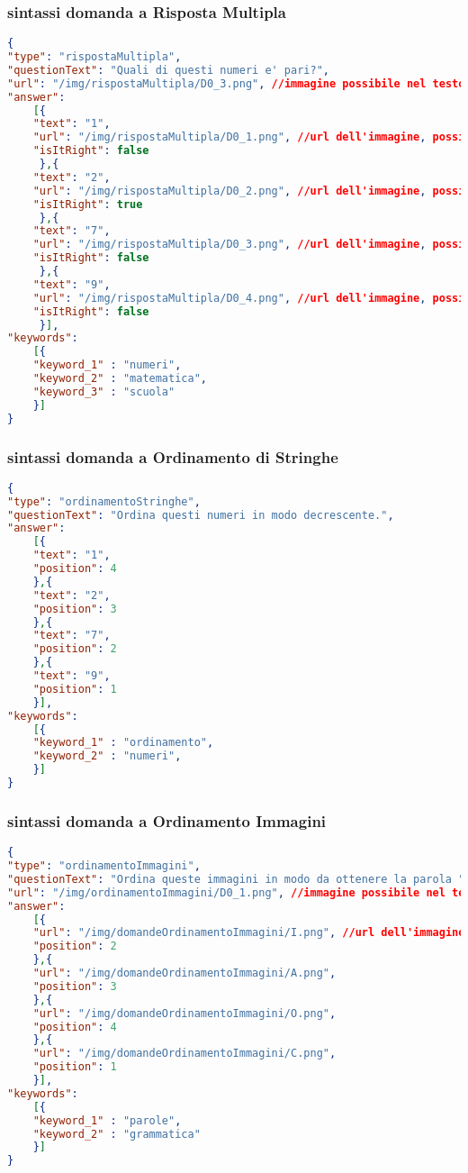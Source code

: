 \subsubsection{sintassi domanda a Risposta Multipla}
\begin{lstlisting}[language=json,firstnumber=1]
{	
"type": "rispostaMultipla",
"questionText": "Quali di questi numeri e' pari?",
"url": "/img/rispostaMultipla/D0_3.png", //immagine possibile nel testo della domanda risposta multipla
"answer":
	[{
	"text": "1",
	"url": "/img/rispostaMultipla/D0_1.png", //url dell'immagine, possibile campo facoltativo
	"isItRight": false
	 },{
	"text": "2",
	"url": "/img/rispostaMultipla/D0_2.png", //url dell'immagine, possibile campo facoltativo
	"isItRight": true
	 },{
	"text": "7",
	"url": "/img/rispostaMultipla/D0_3.png", //url dell'immagine, possibile campo facoltativo
	"isItRight": false
	 },{
	"text": "9",
	"url": "/img/rispostaMultipla/D0_4.png", //url dell'immagine, possibile campo facoltativo
	"isItRight": false
	 }],
"keywords":
	[{
	"keyword_1" : "numeri",
	"keyword_2" : "matematica",
	"keyword_3" : "scuola"
	}]
}
\end{lstlisting}

\subsubsection{sintassi domanda a Ordinamento di Stringhe}
\begin{lstlisting}[language=json,firstnumber=1]
{
"type": "ordinamentoStringhe",
"questionText": "Ordina questi numeri in modo decrescente.",
"answer":
	[{
	"text": "1",
	"position": 4
	},{
	"text": "2",
	"position": 3
	},{
	"text": "7",
	"position": 2
	},{
	"text": "9",
	"position": 1
	}],
"keywords":
	[{
	"keyword_1" : "ordinamento",
	"keyword_2" : "numeri",
	}]
}
\end{lstlisting}

\subsubsection{sintassi domanda a Ordinamento Immagini}
\begin{lstlisting}[language=json,firstnumber=1]
{
"type": "ordinamentoImmagini",
"questionText": "Ordina queste immagini in modo da ottenere la parola "CIAO".",
"url": "/img/ordinamentoImmagini/D0_1.png", //immagine possibile nel testo della domanda ad ordianamento di immagini
"answer":
	[{
	"url": "/img/domandeOrdinamentoImmagini/I.png", //url dell'immagine
	"position": 2
	},{
	"url": "/img/domandeOrdinamentoImmagini/A.png",
	"position": 3
	},{
	"url": "/img/domandeOrdinamentoImmagini/O.png",
	"position": 4
	},{
	"url": "/img/domandeOrdinamentoImmagini/C.png",
	"position": 1
	}],
"keywords":
	[{
	"keyword_1" : "parole",
	"keyword_2" : "grammatica"
	}]
}
\end{lstlisting}

